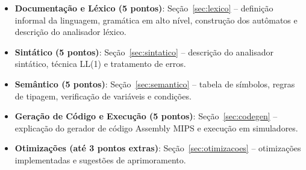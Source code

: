 \documentclass[12pt,a4paper]{article}
\begin{document}
\begin{itemize}
  \item \textbf{Documentação e Léxico (5 pontos)}: Seção~\ref{sec:lexico} -- definição informal da linguagem, gramática em alto nível, construção dos autômatos e descrição do analisador léxico.
  \item \textbf{Sintático (5 pontos)}: Seção~\ref{sec:sintatico} -- descrição do analisador sintático, técnica LL(1) e tratamento de erros.
  \item \textbf{Semântico (5 pontos)}: Seção~\ref{sec:semantico} -- tabela de símbolos, regras de tipagem, verificação de variáveis e condições.
  \item \textbf{Geração de Código e Execução (5 pontos)}: Seção~\ref{sec:codegen} -- explicação do gerador de código Assembly MIPS e execução em simuladores.
  \item \textbf{Otimizações (até 3 pontos extras)}: Seção~\ref{sec:otimizacoes} -- otimizações implementadas e sugestões de aprimoramento.
\end{itemize}
\end{document}
